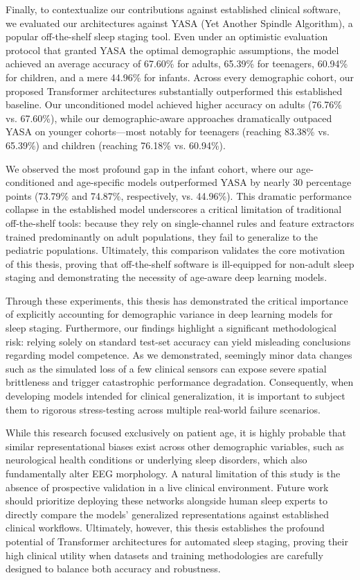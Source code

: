 Finally, to contextualize our contributions against established clinical software,
we evaluated our architectures against YASA (Yet Another Spindle Algorithm),
a popular off-the-shelf sleep staging tool. Even under an optimistic evaluation
protocol that granted YASA the optimal demographic assumptions, the model achieved
an average accuracy of 67.60\% for adults, 65.39\% for teenagers, 60.94\% for children,
and a mere 44.96\% for infants. Across every demographic cohort, our proposed
Transformer architectures substantially outperformed this established baseline.
Our unconditioned model achieved higher accuracy on adults (76.76\% vs. 67.60\%),
while our demographic-aware approaches dramatically outpaced YASA on younger
cohorts—most notably for teenagers (reaching 83.38\% vs. 65.39\%) and children
(reaching 76.18\% vs. 60.94\%).

We observed the most profound gap in the infant cohort, where our age-conditioned
and age-specific models outperformed YASA by nearly 30 percentage points (73.79\%
and 74.87\%, respectively, vs. 44.96\%). This dramatic performance collapse in the
established model underscores a critical limitation of traditional off-the-shelf
tools: because they rely on single-channel rules and feature extractors trained
predominantly on adult populations, they fail to generalize to the
pediatric populations. Ultimately, this comparison
validates the core motivation of this thesis, proving that off-the-shelf software is
ill-equipped for non-adult sleep staging and demonstrating the necessity of age-aware
deep learning models.

Through these experiments, this thesis has demonstrated the critical importance
of explicitly accounting for demographic variance in deep learning models
for sleep staging. Furthermore, our findings highlight a significant
methodological risk: relying solely on standard test-set accuracy can yield
misleading conclusions regarding model competence. As we demonstrated, seemingly
minor data changes such as the simulated loss of a few clinical sensors 
can expose severe spatial brittleness and trigger catastrophic 
performance degradation. Consequently, when developing models intended for 
clinical generalization, it is important to subject them to rigorous 
stress-testing across multiple real-world failure scenarios.

While this research focused exclusively on patient age, it is highly probable
that similar representational biases exist across other demographic variables,
such as neurological health conditions or underlying sleep disorders,
which also fundamentally alter EEG morphology. A natural limitation of
this study is the absence of prospective validation in a live clinical
environment. Future work should prioritize deploying these networks alongside
human sleep experts to directly compare the models' generalized representations
against established clinical workflows. Ultimately, however, this thesis
establishes the profound potential of Transformer architectures for
automated sleep staging, proving their high clinical utility when datasets
and training methodologies are carefully designed to balance both accuracy and robustness.